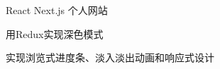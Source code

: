 

\begin{cventries}

  \cventry
    {React Next.js} %
    {个人网站} %
    {} %
    {} %
    {
      \begin{cvitems} %
        \item {用Redux实现深色模式}
        \item {实现浏览式进度条、淡入淡出动画和响应式设计}
      \end{cvitems}
    }

\end{cventries}


  
